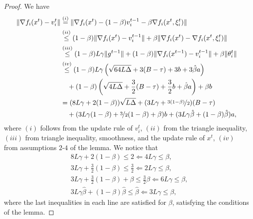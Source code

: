 \documentclass[a4paper,11pt]{article}
\begin{document}
\begin{proof}
    We have 
    \begin{align*}
        \|\nabla f_i(x^t)-v_i^t\| &\overset{(i)}{=} \|\nabla f_i(x^t) - (1-\beta)v_i^{t-1} - \beta\nabla f_i(x^t,\xi^t_i)\|\\
        &\overset{(ii)}{\le} (1-\beta)\|\nabla f_i(x^t) - v_i^{t-1}\|
        + \beta\|\nabla f_i(x^t) - \nabla f_i(x^t,\xi^t_i)\|\\
        &\overset{(iii)}{\le} (1-\beta) L\gamma\|g^{t-1}\| 
        + (1-\beta)\|\nabla f_i(x^{t-1})-v_i^{t-1}\|
        + \beta\|\theta^t_i\|\\
        &\overset{(iv)}{\le} (1-\beta)L\gamma\left(\sqrt{64L\Delta} + 3(B-\tau) + 3 b + 3\hat{\beta}a\right)\\
        & \quad + (1-\beta)\left(\sqrt{4L\Delta}+\frac{3}{2}(B-\tau) + \frac{3}{2} b + \hat{\beta}a\right)
        + \beta b\\
        &= (8L\gamma + 2(1-\beta))\sqrt{L\Delta}
        + (3L\gamma + \nicefrac{3(1-\beta)}{2})(B-\tau)\\
        &\quad + (3L\gamma(1-\beta) + \nicefrac{3}{2}(1-\beta) + \beta)b
        + (3L\gamma\hat{\beta} + (1-\beta)\hat{\beta})a,
    \end{align*}
    where $(i)$ follows from the update rule of $v_i^t$, $(ii)$ from the triangle inequality, $(iii)$ from triangle inequality, smoothness, and the update rule of $x^t$, $(iv)$ from assumptions $2$-$4$ of the lemma. We notice that
    \begin{align*}
    & 8L\gamma + 2(1-\beta) \le 2 \Leftarrow 4L\gamma \le \beta,\\
    & 3L\gamma + \frac{3}{2}(1-\beta) \le \frac{3}{2} \Leftarrow 2L\gamma \le \beta,\\
    & 3L\gamma + \frac{3}{2}(1-\beta) + \beta \le \frac{3}{2}\beta
    \Leftarrow 6L\gamma \le \beta, \\
    & 3L\gamma\hat{\beta} + (1-\beta)\hat{\beta} \le \hat{\beta} \Leftarrow 3L\gamma \le \beta,
    \end{align*}
    where the last inequalities in each line are satisfied for $\beta$, satisfying the conditions of the lemma.
\end{proof}
\end{document}
